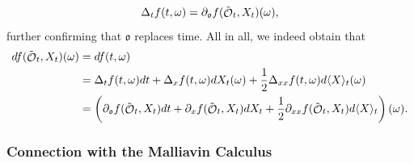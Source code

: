 \documentclass[11pt]{article}
\def\mo{\mathfrak{o}}
\theoremstyle{plain}
\theoremstyle{definition}
\DeclareMathOperator{\calO}{\mathcal{O}}
\begin{document}

\begin{equation}\label{eq:OCCvsFITO}
 \Delta_t \textnormal{f}(t,\omega) = \partial_{\mo} f(\tilde{\calO}_t,X_t)(\omega),
\end{equation}
further confirming that $\mo$ replaces time. %
All in all, we indeed obtain that 
\begin{align*}
df(\tilde{\calO}_t,X_t)(\omega)  &= d\textnormal{f}(t,\omega) \\
 &=    \Delta_t\textnormal{f}(t,\omega)dt  %
        + \Delta_{x}\textnormal{f}(t,\omega) dX_t(\omega) +   \frac{1}{2}\Delta_{xx} \textnormal{f}(t,\omega) d\langle X \rangle_t(\omega)\\
&=  \left(\partial_{\mo} f(\tilde{\calO}_t,X_t) dt+ \partial_x f(\tilde{\calO}_t,X_t)dX_t  + \frac{1}{2} \partial_{xx}f(\tilde{\calO}_t,X_t) d\langle X \rangle_t\right)(\omega).
\end{align*}


\subsubsection{Connection with the Malliavin Calculus}\label{sec:Malliavin}
 
\end{document}
